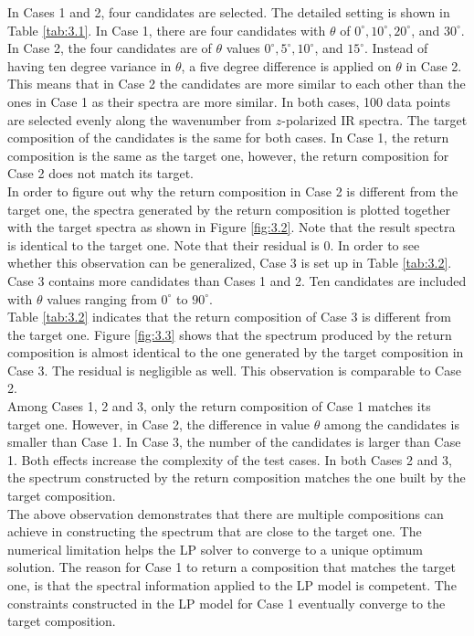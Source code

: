 In Cases 1 and 2, four candidates are selected. The detailed setting is shown in Table \ref{tab:3.1}. In Case 1, there are four candidates with $\theta$ of $0^{\circ}, 10^{\circ}, 20^{\circ}$, and $30^{\circ}$. In Case 2, the four candidates are of $\theta$ values $0^{\circ}, 5^{\circ}, 10^{\circ}$, and $15^{\circ}$. Instead of having ten degree variance in $\theta$, a five degree difference is applied on $\theta$ in Case 2. This means that in Case 2 the candidates are more similar to each other than the ones in Case 1 as their spectra are more similar. In both cases, 100 data points are selected evenly along the wavenumber from $z$-polarized IR spectra. The target composition of the candidates is the same for both cases. In Case 1, the return composition is the same as the target one, however, the return composition for Case 2 does not match its target. \\

In order to figure out why the return composition in Case 2 is different from the target one, the spectra generated by the return composition is plotted together with the target spectra as shown in Figure \ref{fig:3.2}. Note that the result spectra is identical to the target one. Note that their residual is $0$. In order to see whether this observation can be generalized, Case 3 is set up in Table \ref{tab:3.2}. Case 3 contains more candidates than Cases 1 and 2. Ten candidates are included with $\theta$ values ranging from $0^{\circ}$ to $90^{\circ}$.  \\

Table \ref{tab:3.2} indicates that the return composition of Case 3 is different from the target one. Figure \ref{fig:3.3} shows that the spectrum produced by the return composition is almost identical to the one generated by the target composition in Case 3. The residual is negligible as well. This observation is comparable to Case 2. \\

Among Cases 1, 2 and 3, only the return composition of Case 1 matches its target one. However, in Case 2, the difference in value $\theta$ among the candidates is smaller than Case 1. In Case 3, the number of the candidates is larger than Case 1. Both effects increase the complexity of the test cases. In both Cases 2 and 3, the spectrum constructed by the return composition matches the one built by the target composition. \\

The above observation demonstrates that there are multiple compositions can achieve in constructing the spectrum that are close to the target one. The numerical limitation helps the LP solver to converge to a unique optimum solution. The reason for Case 1 to return a composition that matches the target one, is that the spectral information applied to the LP model is competent. The constraints constructed in the LP model for Case 1 eventually converge to the target composition. \\ 

